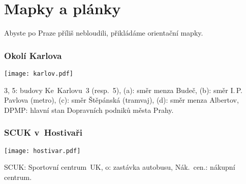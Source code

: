 \section{Mapky a plánky}
Abyste po Praze příliš nebloudili, přikládáme orientační mapky.

\subsubsection*{Okolí Karlova}

\begin{center}\texttt{[image: karlov.pdf]}\end{center}

 3, 5: budovy Ke~Karlovu~3 (resp.~5),
(a): směr menza Budeč, (b): směr I.$\,$P.$\,$Pavlova (metro),
(c): směr Štěpánská (tramvaj), (d): směr menza Albertov,
DPMP: hlavní stan Dopravních podniků města Prahy.

\subsubsection*{SCUK v~Hostivaři}
\begin{center}\texttt{[image: hostivar.pdf]}\end{center}

 SCUK: Sportovní centrum~UK, o: zastávka autobusu, Nák.~cen.: nákupní centrum.